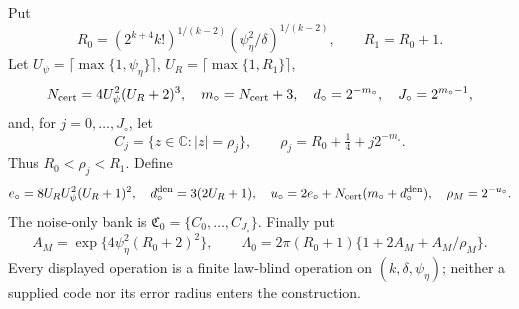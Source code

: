 Put
\[
 R_0=(2^{k+4}k!)^{1/(k-2)}
       (\psi_\eta^2/\delta)^{1/(k-2)},
 \qquad R_1=R_0+1.
\]
Let \(U_\psi=\lceil\max\{1,\psi_\eta\}\rceil\), \(U_R=\lceil\max\{1,R_1\}\rceil\),
\[
 N_{\rm cert}=4U_\psi^2(U_R+2)^3,
 \quad m_\circ=N_{\rm cert}+3,
 \quad d_\circ=2^{-m_\circ},
 \quad J_\circ=2^{m_\circ-1},
\]
and, for \(j=0,\ldots,J_\circ\), let
\[
 C_j=\{z\in\mathbb C:|z|=\rho_j\},
 \qquad \rho_j=R_0+\tfrac14+j2^{-m_\circ}.
\]
Thus \(R_0<\rho_j<R_1\).  Define
\[
 e_\circ=8U_RU_\psi^2(U_R+1)^2,
 \quad d_\circ^{\rm den}=3(2U_R+1),
 \quad u_\circ=2e_\circ+N_{\rm cert}(m_\circ+d_\circ^{\rm den}),
 \quad \rho_M=2^{-u_\circ}.
\]
The noise-only bank is \(\mathfrak C_0=\{C_0,\ldots,C_{J_\circ}\}\).  Finally put
\[
 A_M=\exp\{4\psi_\eta^2(R_0+2)^2\},
 \qquad
 \Lambda_0=2\pi(R_0+1)
 \{1+2A_M+A_M/\rho_M\}.
\]
Every displayed operation is a finite law-blind operation on \((k,\delta,\psi_\eta)\); neither a supplied code nor its error radius enters the construction.